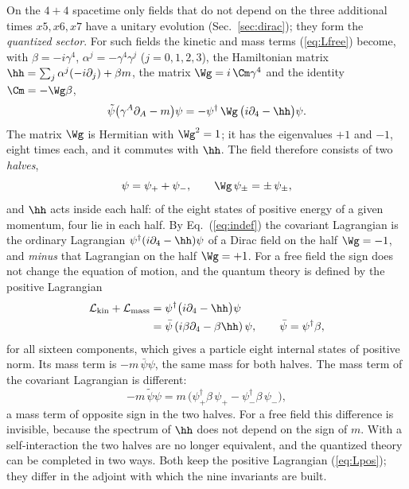 On the $4+4$ spacetime only fields that do not depend on the three additional times $x5,x6,x7$ have a
unitary evolution (Sec.~\ref{sec:dirac}); they form the \emph{quantized sector}. For such fields the
kinetic and mass terms (\ref{eq:Lfree}) become, with $\beta=-i\gamma^{4}$,
$\alpha^{j}=-\gamma^{4}\gamma^{j}$ ($j=0,1,2,3$), the Hamiltonian matrix
$\hh=\sum_j\alpha^{j}(-i\partial_j)+\beta m$, the matrix $\Wg=i\,\Cm\gamma^{4}$ and the identity
$\Cm=-\Wg\beta$,
\begin{equation}
\tilde\psi\big(\gamma^{A}\partial_A-m\big)\psi=-\psi^\dagger\,\Wg\,\big(i\partial_4-\hh\big)\psi .
\label{eq:indef}
\end{equation}
The matrix $\Wg$ is Hermitian with $\Wg^{2}=1$; it has the eigenvalues $+1$ and $-1$, eight times
each, and it commutes with $\hh$. The field therefore consists of two \emph{halves},
\begin{equation}
\psi=\psi_++\psi_-,\qquad\Wg\,\psi_\pm=\pm\,\psi_\pm ,
\label{eq:halves}
\end{equation}
and $\hh$ acts inside each half: of the eight states of positive energy of a given momentum, four lie
in each half. By Eq.~(\ref{eq:indef}) the covariant Lagrangian is the ordinary Lagrangian
$\psi^\dagger(i\partial_4-\hh)\psi$ of a Dirac field on the half $\Wg=-1$, and \emph{minus} that
Lagrangian on the half $\Wg=+1$. For a free field the sign does not change the equation of motion, and
the quantum theory is defined by the positive Lagrangian
\begin{equation}
\begin{aligned}
\mathcal L_{\mathrm{kin}}+\mathcal L_{\mathrm{mass}}&=\psi^\dagger\big(i\partial_4-\hh\big)\psi\\
&=\bar\psi\,(i\beta\partial_4-\beta\hh)\,\psi,\qquad\bar\psi=\psi^\dagger\beta,
\end{aligned}
\label{eq:Lpos}
\end{equation}
for all sixteen components, which gives a particle eight internal states of positive norm. Its mass
term is $-m\,\bar\psi\psi$, the same mass for both halves. The mass term of the covariant Lagrangian
is different:
\begin{equation}
-m\,\tilde\psi\psi=m\,\big(\psi_+^\dagger\beta\,\psi_+-\psi_-^\dagger\beta\,\psi_-\big),
\label{eq:covmass}
\end{equation}
a mass term of opposite sign in the two halves. For a free field this difference is invisible,
because the spectrum of $\hh$ does not depend on the sign of $m$. With a self-interaction the two
halves are no longer equivalent, and the quantized theory can be completed in two ways. Both keep
the positive Lagrangian (\ref{eq:Lpos}); they differ in the adjoint with which the nine invariants
are built.

